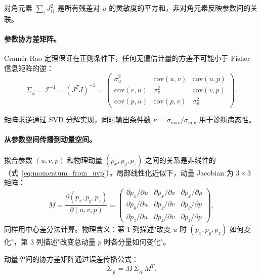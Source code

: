 \documentclass[a4paper, 11pt]{article}
\begin{document}
对角元素 $\sum_i J_{i1}^2$ 是所有残差对 $u$ 的灵敏度的平方和，非对角元素反映参数间的关联。

\paragraph{参数协方差矩阵。}
Cramér-Rao 定理保证在正则条件下，任何无偏估计量的方差不可能小于 Fisher 信息矩阵的逆：
\begin{equation}
  \Sigma_{\vec{\alpha}} = \mathcal{I}^{-1} = (J^T J)^{-1} =
  \begin{pmatrix}
    \sigma_u^2 & \mathrm{cov}(u,v) & \mathrm{cov}(u,p) \\
    \mathrm{cov}(v,u) & \sigma_v^2 & \mathrm{cov}(v,p) \\
    \mathrm{cov}(p,u) & \mathrm{cov}(p,v) & \sigma_p^2
  \end{pmatrix}.
  \label{eq:fisher_cov}
\end{equation}

矩阵求逆通过 SVD 分解实现，同时输出条件数 $\kappa = \sigma_\mathrm{max}/\sigma_\mathrm{min}$ 用于诊断病态性。

\paragraph{从参数空间传播到动量空间。}
拟合参数 $(u, v, p)$ 和物理动量 $(p_x, p_y, p_z)$ 之间的关系是非线性的（式~\eqref{eq:momentum_from_uvp}）。局部线性化近似下，动量 Jacobian 为 $3 \times 3$ 矩阵：
\begin{equation}
  M = \frac{\partial (p_x, p_y, p_z)}{\partial (u, v, p)}
  = \begin{pmatrix}
    \partial p_x/\partial u & \partial p_x/\partial v & \partial p_x/\partial p \\
    \partial p_y/\partial u & \partial p_y/\partial v & \partial p_y/\partial p \\
    \partial p_z/\partial u & \partial p_z/\partial v & \partial p_z/\partial p
  \end{pmatrix},
  \label{eq:momentum_jacobian}
\end{equation}
同样用中心差分法计算。物理含义：第 1 列描述"改变 $u$ 时 $(p_x, p_y, p_z)$ 如何变化"，第 3 列描述"改变总动量 $p$ 时各分量如何变化"。

动量空间的协方差矩阵通过误差传播公式：
\begin{equation}
  \Sigma_{\vec{p}} = M \, \Sigma_{\vec{\alpha}} \, M^T.
  \label{eq:momentum_cov}
\end{equation}
\end{document}
